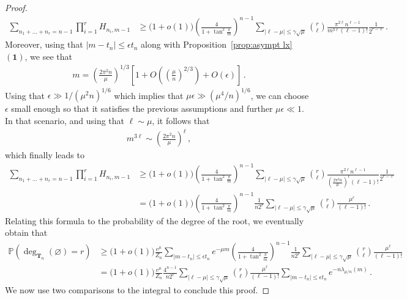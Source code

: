\documentclass{article}
\newcommand{\pr}{\mathbb{P}}								%
\newcommand{\Prob}[1]{\pr\left(#1\right)}					%
\newcommand{\1}{\mathbbm{1}}								%
\theoremstyle{definition}
\numberwithin{equation}{section}
\newcommand{\numitem}[1]{$\mathbf{(#1)}$}
\begin{document}
\begin{proof}
    \begin{align*}
        \sum_{n_1+\ldots+n_r=n-1}\prod_{i=1}^rH_{n_i,m-1}
        &\geq\big(1+o(1)\big)\left(\frac{4}{1+\tan^2\frac{\pi}{m}}\right)^{n-1}\sum_{|\ell-\mu|\leq\gamma\sqrt{\mu}}\binom{r}{\ell}\frac{\pi^{2\ell}n^{\ell-1}}{m^{3\ell}(\ell-1)!}\frac{1}{2^{r-\ell}}\,.
    \end{align*}
    Moreover, using that $|m-t_n|\leq\epsilon t_n$ along with Proposition~\ref{prop:asympt lx}~\numitem{1}, we see that
    \begin{align*}
        m=\left(\frac{2\pi^2n}{\mu}\right)^{1/3}\left[1+O\left(\left(\frac{\mu}{n}\right)^{2/3}\right)+O(\epsilon)\right]\,.
    \end{align*}
    Using that $\epsilon\gg1/(\mu^2n)^{1/6}$ which implies that $\mu\epsilon\gg(\mu^4/n)^{1/6}$, we can choose $\epsilon$ small enough so that it satisfies the previous assumptions and further $\mu\epsilon\ll1$.
    In that scenario, and using that $\ell\sim\mu$, it follows that
    \begin{align*}
        m^{3\ell}\sim\left(\frac{2\pi^2n}{\mu}\right)^\ell\,,
    \end{align*}
    which finally leads to
    \begin{align*}
        \sum_{n_1+\ldots+n_r=n-1}\prod_{i=1}^rH_{n_i,m-1}
        &\geq\big(1+o(1)\big)\left(\frac{4}{1+\tan^2\frac{\pi}{m}}\right)^{n-1}\sum_{|\ell-\mu|\leq\gamma\sqrt{\mu}}\binom{r}{\ell}\frac{\pi^{2\ell}n^{\ell-1}}{\left(\frac{2\pi^2n}{\mu}\right)^\ell(\ell-1)!}\frac{1}{2^{r-\ell}}\\
        &=\big(1+o(1)\big)\left(\frac{4}{1+\tan^2\frac{\pi}{m}}\right)^{n-1}\frac{1}{n2^r}\sum_{|\ell-\mu|\leq\gamma\sqrt{\mu}}\binom{r}{\ell}\frac{\mu^\ell}{(\ell-1)!}\,.
    \end{align*}
    Relating this formula to the probability of the degree of the root, we eventually obtain that
    \begin{align*}
        \Prob{\deg_{\mathbf{T}_n}(\varnothing)=r}
        &\geq\big(1+o(1)\big)\frac{e^\mu}{Z_n}\sum_{|m-t_n|\leq\epsilon t_n}e^{-\mu m}\left(\frac{4}{1+\tan^2\frac{\pi}{m}}\right)^{n-1}\frac{1}{n2^r}\sum_{|\ell-\mu|\leq\gamma\sqrt{\mu}}\binom{r}{\ell}\frac{\mu^\ell}{(\ell-1)!}\\
        &=\big(1+o(1)\big)\frac{e^\mu}{Z_n}\frac{4^{n-1}}{n2^r}\sum_{|\ell-\mu|\leq\gamma\sqrt{\mu}}\binom{r}{\ell}\frac{\mu^\ell}{(\ell-1)!}\sum_{|m-t_n|\leq\epsilon t_n}e^{-n\lambda_{\mu/n}(m)}\,.
    \end{align*}
    We now use two comparisons to the integral to conclude this proof.


\end{proof}
\end{document}
